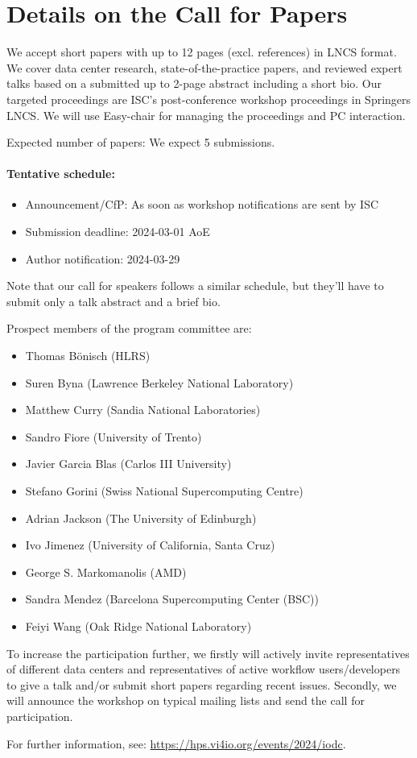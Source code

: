 \documentclass[a4paper,10pt]{article}
\begin{document}
\section{Details on the Call for Papers}

We accept short papers with up to 12 pages (excl. references) in LNCS format.
We cover data center research, state-of-the-practice papers, and reviewed expert talks based on a submitted up to 2-page abstract including a short bio.
Our targeted proceedings are ISC's post-conference workshop proceedings in Springers LNCS.
We will use Easy-chair for managing the proceedings and PC interaction.

Expected number of papers: We expect 5 submissions.

\paragraph{Tentative schedule:}
\begin{itemize}
  \item Announcement/CfP: As soon as workshop notifications are sent by ISC
  \item Submission deadline: 2024-03-01 AoE
  \item Author notification: 2024-03-29
\end{itemize}
Note that our call for speakers follows a similar schedule, but they'll have to submit only a talk abstract and a brief bio.

Prospect members of the program committee are:
\begin{itemize}
  \item Thomas Bönisch (HLRS)
  \item Suren Byna (Lawrence Berkeley National Laboratory) 
  \item Matthew Curry (Sandia National Laboratories)  
  \item Sandro Fiore (University of Trento)  
  \item Javier Garcia Blas (Carlos III University) 
  \item Stefano Gorini (Swiss National Supercomputing Centre) 
  \item Adrian Jackson (The University of Edinburgh) 
  \item Ivo Jimenez (University of California, Santa Cruz)
  \item George S. Markomanolis (AMD) 
  \item Sandra Mendez (Barcelona Supercomputing Center (BSC)) 
  \item Feiyi Wang (Oak Ridge National Laboratory) 
\end{itemize}

To increase the participation further, we firstly will actively invite representatives of different data centers and representatives of active workflow users/developers to give a talk and/or submit short papers regarding recent issues.
Secondly, we will announce the workshop on typical mailing lists and send the call for participation.


For further information, see:
\url{https://hps.vi4io.org/events/2024/iodc}.
\end{document}
